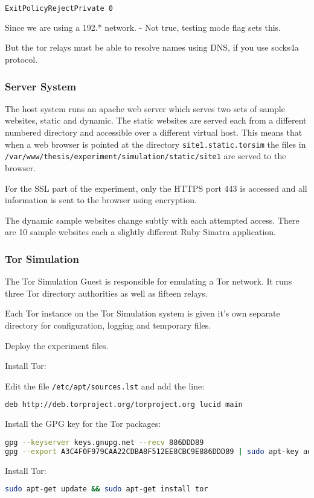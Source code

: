 \begin{lstlisting}[language=sh]
ExitPolicyRejectPrivate 0
\end{lstlisting}

Since we are using a 192.* network. - Not true, testing mode flag sets this.

But the tor relays must be able to resolve names using DNS, if you use socks4a protocol.

\subsubsection{Server System}

The host system runs an apache web server which serves two sets of sample
websites, static and dynamic. The static websites are served each from a
different numbered directory and accessible over a different virtual host. This
means that when a web browser is pointed at the directory
\verb+site1.static.torsim+ the files in
\verb+/var/www/thesis/experiment/simulation/static/site1+ are served to the
browser.

For the SSL part of the experiment, only the HTTPS port 443 is accessed and all
information is sent to the browser using encryption.

The dynamic sample websites change subtly with each attempted access. There are
10 sample websites each a slightly different Ruby Sinatra application.

\subsubsection{Tor Simulation}

The Tor Simulation Guest is responsible for emulating a Tor network. It runs
three Tor directory authorities as well as fifteen relays.

Each Tor instance on the Tor Simulation system is given it's own separate
directory for configuration, logging and temporary files.

Deploy the experiment files.

Install Tor:

\begin{enumerate*}
  \item Edit the file \verb+/etc/apt/sources.lst+ and add the line:
    \begin{lstlisting}[language=sh]
deb http://deb.torproject.org/torproject.org lucid main
    \end{lstlisting}
  \item Install the GPG key for the Tor packages:
    \begin{lstlisting}[language=sh]
gpg --keyserver keys.gnupg.net --recv 886DDD89
gpg --export A3C4F0F979CAA22CDBA8F512EE8CBC9E886DDD89 | sudo apt-key add -
    \end{lstlisting}
  \item Install Tor:
    \begin{lstlisting}[language=sh]
sudo apt-get update && sudo apt-get install tor
    \end{lstlisting}
\end{enumerate*}

